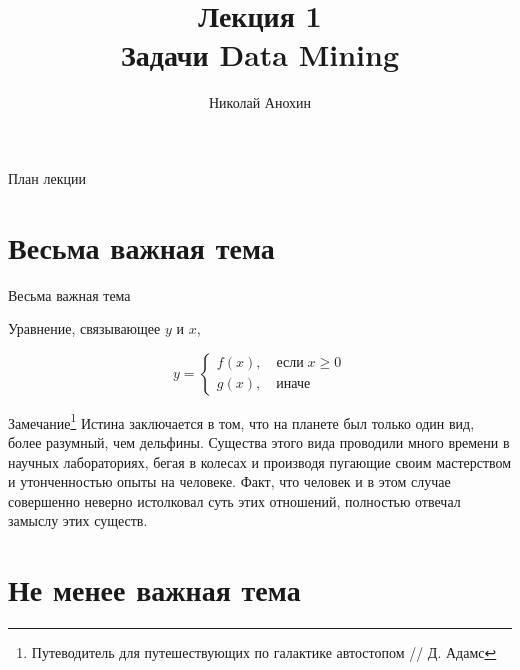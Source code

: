 \documentclass[10pt]{beamer}
\author{Николай Анохин}
\title{\newline \newline \newline Лекция 1 \\ Задачи Data Mining}
\let\otp\titlepage
\renewcommand{\titlepage}{\otp\addtocounter{framenumber}{-1}}
\begin{document}
\begin{frame}[plain]
\titlepage
\end{frame}

\begin{frame}{План лекции}
\tableofcontents
\end{frame}

\section{Весьма важная тема}

\begin{frame}{Весьма важная тема}

Уравнение, связывающее $y$ и $x$,

\[
y = \begin{cases}
f(x),\quad\text{если}\;x \geqslant 0 \\
g(x),\quad\text{иначе}
\end{cases}
\]

\begin{alertblock}{Замечание\footnote{Путеводитель для путешествующих по галактике автостопом // Д. Адамс}}
Истина заключается в том, что на планете был только один вид, более разумный, чем дельфины. Существа этого вида проводили много времени в научных лабораториях, бегая в колесах и производя пугающие своим мастерством и утонченностью опыты на человеке. Факт, что человек и в этом случае совершенно неверно истолковал суть этих отношений, полностью отвечал замыслу этих существ.
\end{alertblock}

\end{frame}

\section{Не менее важная тема}
\end{document}
